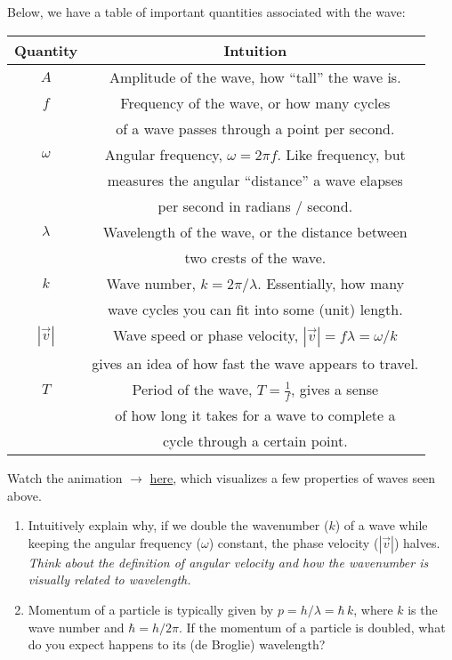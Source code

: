 \documentclass{article}
\begin{document}
Below, we have a table of important quantities associated with the wave:
\begin{center}
\begin{tabular}{| c | c |}
	\hline
	Quantity & Intuition \\
	\hline
	$A$ & Amplitude of the wave, how ``tall'' the wave is. \\
	\hline
	$f$ & Frequency of the wave, or how many cycles\\ 
	& of a wave passes through a point per second. \\
	\hline
	$\omega$ & Angular frequency, $\omega = 2\pi f$. Like frequency, but \\
	& measures the angular ``distance'' a wave elapses \\
	& per second in radians / second. \\
	\hline
	$\lambda$ & Wavelength of the wave, or the distance between \\
	& two crests of the wave. \\
	\hline
	$k$ & Wave number, $k = 2\pi / \lambda$. Essentially, how many \\
	& wave cycles you can fit into some (unit) length. \\
	\hline
	$|\vec{v}|$ & Wave speed or phase velocity, $|\vec{v}| = f\lambda = \omega / k$\\ 
	& gives an idea of how fast the wave appears to travel. \\
	\hline
	$T$ & Period of the wave, $T = \frac{1}{f}$, gives a sense \\
	& of how long it takes for a wave to complete a \\
	& cycle through a certain point. \\
	\hline
\end{tabular}
\end{center}


\begin{tcolorbox}[arc=2mm, colback=red!10!white, colframe=red!50!black, title=\textbf{ACTIVITY}]
	Watch the animation $\rightarrow$ \textcolor{red}{\href{https://youtu.be/CHYc6YgaYY8}{here}}, which visualizes a few properties of waves seen above.
\end{tcolorbox}

\begin{tcolorbox}[colframe=blue!50!black, arc=2mm, title=\textsc{Practice 1}]
	\begin{enumerate}[label=(\alph*)]
		\item Intuitively explain why, if we double the wavenumber ($k$) of a wave while keeping the angular frequency ($\omega$) constant, the phase velocity ($|\vec{v}|$) halves. \textit{Think about the definition of angular velocity and how the wavenumber is visually related to wavelength.}
		\item Momentum of a particle is typically given by $p = h / \lambda = \hbar\, k$, where $k$ is the wave number and $\hbar = h / 2\pi$. If the momentum of a particle is doubled, what do you expect happens to its (de Broglie) wavelength? 
	\end{enumerate}
\end{tcolorbox}
\end{document}
